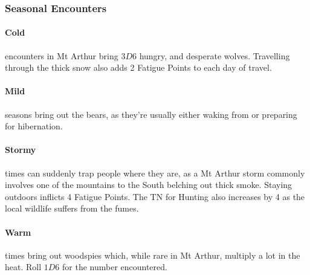 \begin{multicols}{2}
\subsubsection{Seasonal Encounters}

\paragraph{Cold} encounters in Mt Arthur bring $3D6$ hungry, and desperate wolves.
Travelling through the thick snow also adds 2 Fatigue Points to each day of travel.
\paragraph{Mild} seasons bring out the bears, as they're usually either waking from or preparing for hibernation.
\paragraph{Stormy} times can suddenly trap people where they are, as a Mt Arthur storm commonly involves one of the mountains to the South belching out thick smoke.
Staying outdoors inflicts 4 Fatigue Points.
The TN for Hunting also increases by 4 as the local wildlife suffers from the fumes.
\paragraph{Warm} times bring out woodspies which, while rare in Mt Arthur, multiply a lot in the heat.
Roll $1D6$ for the number encountered.

\iftoggle{players}{}{
\begin{encounters}{Mt Arthur}

	Forest & Roads & Result \\\hline
	\li & Mana Lake (page \pageref{mana_lake}). \\
	\li & Basilisk (page \pageref{basilisk}). \\
	\li \lii $3D6-2$ travelling elves (page \pageref{elf}). \\
	\li \lii Chitincrawler (page \pageref{chitincrawler}). \\
	\li \lii $4D6-2$ Bandits (page \pageref{human_soldier}). \\
	\li \lii Seasonal Encounter. \\
	& \lii $3D6-2$ Travelling pilgrims. \\
	& \lii $4D6$ Human traders (page \pageref{human_trader}). \\


\end{encounters}}
\end{multicols}
